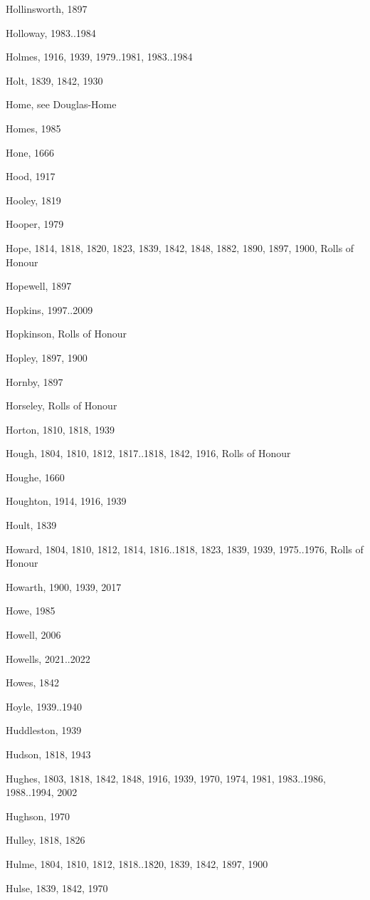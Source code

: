 {\begin{theindex}
\item Hollinsworth, 1897
\item Holloway, 1983..1984
\item Holmes, 1916, 1939, 1979..1981, 1983..1984
\item Holt, 1839, 1842, 1930
\item Home, see Douglas-Home
\item Homes, 1985
\item Hone, 1666
\item Hood, 1917
\item Hooley, 1819
\item Hooper, 1979
\item Hope, 1814, 1818, 1820, 1823, 1839, 1842, 1848, 1882, 1890, 1897, 1900, Rolls of Honour
\item Hopewell, 1897
\item Hopkins, 1997..2009
\item Hopkinson, Rolls of Honour
\item Hopley, 1897, 1900
\item Hornby, 1897
\item Horseley, Rolls of Honour
\item Horton, 1810, 1818, 1939
\item Hough, 1804, 1810, 1812, 1817..1818, 1842, 1916, Rolls of Honour
\item Houghe, 1660
\item Houghton, 1914, 1916, 1939
\item Hoult, 1839
\item Howard, 1804, 1810, 1812, 1814, 1816..1818, 1823, 1839, 1939, 1975..1976, Rolls of Honour
\item Howarth, 1900, 1939, 2017
\item Howe, 1985
\item Howell, 2006
\item Howells, 2021..2022
\item Howes, 1842
\item Hoyle, 1939..1940
\item Huddleston, 1939
\item Hudson, 1818, 1943
\item Hughes, 1803, 1818, 1842, 1848, 1916, 1939, 1970, 1974, 1981, 1983..1986, 1988..1994, 2002
\item Hughson, 1970
\item Hulley, 1818, 1826
\item Hulme, 1804, 1810, 1812, 1818..1820, 1839, 1842, 1897, 1900
\item Hulse, 1839, 1842, 1970

\end{theindex}}
